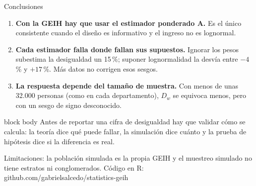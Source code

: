 \documentclass[aspectratio=169,11pt]{beamer}
\newenvironment{caja}{\begin{beamercolorbox}[sep=5pt]{block body}}{\end{beamercolorbox}}
\begin{document}
\begin{frame}{Conclusiones}
  \vspace{-0.2cm}
  \begin{enumerate}
    \item \textbf{Con la GEIH hay que usar el estimador ponderado A.} Es el único consistente cuando el diseño es informativo y el ingreso no es lognormal.
    \item \textbf{Cada estimador falla donde fallan sus supuestos.} Ignorar los pesos subestima la desigualdad un 15\,\%; suponer lognormalidad la desvía entre $-4$\,\% y $+17$\,\%. Más datos no corrigen esos sesgos.
    \item \textbf{La respuesta depende del tamaño de muestra.} Con menos de unas 32.000 personas (como en cada departamento), $D_w$ se equivoca menos, pero con un sesgo de signo desconocido.
  \end{enumerate}

  \vspace{0.2cm}
  \begin{caja}
    \small\centering Antes de reportar una cifra de desigualdad hay que validar cómo se calcula: la teoría dice qué puede fallar, la simulación dice cuánto y la prueba de hipótesis dice si la diferencia es real.
  \end{caja}

  \vspace{0.1cm}
  {\scriptsize\color{gray} Limitaciones: la población simulada es la propia GEIH y el muestreo simulado no tiene estratos ni conglomerados. Código en R: github.com/gabrielsalcedo/statistics-geih}

  \vspace{0.05cm}
\end{frame}
\end{document}
